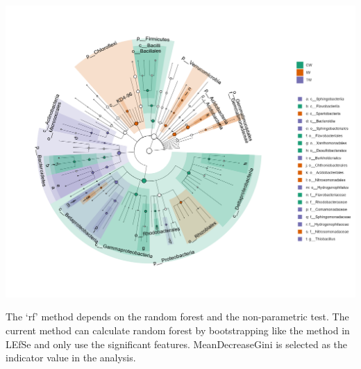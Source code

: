 \documentclass[
]{book}
\begin{document}
\begin{center}\includegraphics[width=1000px]{Images/trans_diff_lefse_cladogram_1} \end{center}

The `rf' method depends on the random forest\citep{Beck_Machine_2014, Yatsunenko_Human_2012} and the non-parametric test.
The current method can calculate random forest by bootstrapping like the method in LEfSe and only use the significant features.
MeanDecreaseGini is selected as the indicator value in the analysis.
\end{document}
